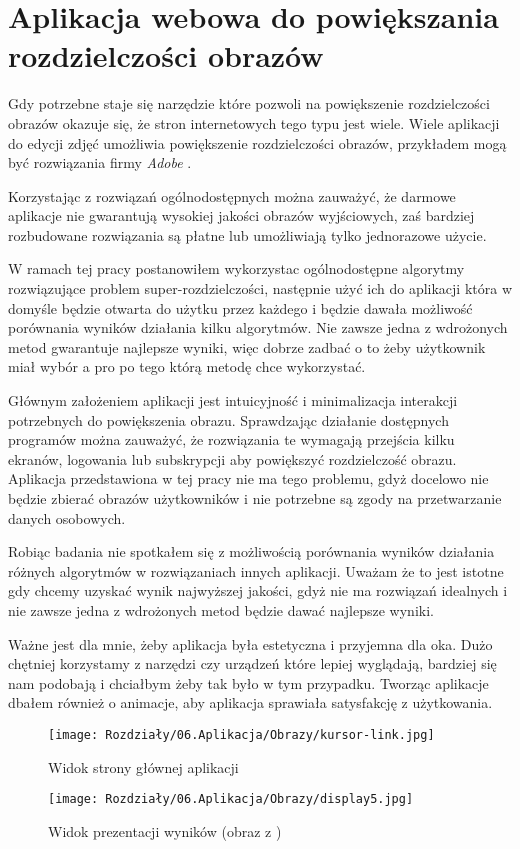 \chapter{Aplikacja webowa do powiększania rozdzielczości obrazów} \label{chap:app}

Gdy potrzebne staje się narzędzie które pozwoli na powiększenie rozdzielczości obrazów okazuje się, że stron internetowych tego typu jest wiele. Wiele aplikacji do edycji zdjęć umożliwia powiększenie rozdzielczości obrazów, przykładem mogą być rozwiązania firmy \textit{Adobe} \cite{adobefonts}.

Korzystając z rozwiązań ogólnodostępnych można zauważyć, że darmowe aplikacje nie gwarantują wysokiej jakości obrazów wyjściowych, zaś bardziej rozbudowane rozwiązania są płatne lub umożliwiają tylko jednorazowe użycie. 

W ramach tej pracy postanowiłem wykorzystac ogólnodostępne algorytmy rozwiązujące problem super-rozdzielczości, następnie użyć ich do aplikacji która w domyśle będzie otwarta do użytku przez każdego i będzie dawała możliwość porównania wyników działania kilku algorytmów. Nie zawsze jedna z wdrożonych metod gwarantuje najlepsze wyniki, więc dobrze zadbać o to żeby użytkownik miał wybór a pro po tego którą metodę chce wykorzystać.

Głównym założeniem aplikacji jest intuicyjność i minimalizacja interakcji potrzebnych do powiększenia obrazu. Sprawdzając działanie dostępnych programów można zauważyć, że rozwiązania te wymagają przejścia kilku ekranów, logowania lub subskrypcji aby powiększyć rozdzielczość obrazu. Aplikacja przedstawiona w tej pracy nie ma tego problemu, gdyż docelowo nie będzie zbierać obrazów użytkowników i nie potrzebne są zgody na przetwarzanie danych osobowych.

Robiąc badania nie spotkałem się z możliwością porównania wyników działania różnych algorytmów w rozwiązaniach innych aplikacji. Uważam że to jest istotne gdy chcemy uzyskać wynik najwyższej jakości, gdyż nie ma rozwiązań idealnych i nie zawsze jedna z wdrożonych metod będzie dawać najlepsze wyniki.

Ważne jest dla mnie, żeby aplikacja była estetyczna i przyjemna dla oka. Dużo chętniej korzystamy z narzędzi czy urządzeń które lepiej wyglądają, bardziej się nam podobają i chciałbym żeby tak było w tym przypadku. Tworząc aplikacje dbałem również o animacje, aby aplikacja sprawiała satysfakcję z użytkowania.

\newpage
\begin{figure}[H]
    \begin{minipage}{\linewidth}
        \centering
        \texttt{[image: Rozdziały/06.Aplikacja/Obrazy/kursor-link.jpg]}  
        \caption{Widok strony głównej aplikacji}
        \label{fig:image80}
        \hspace{2cm}
        \texttt{[image: Rozdziały/06.Aplikacja/Obrazy/display5.jpg]}  
        \caption{Widok prezentacji wyników (obraz z \cite{guo2017deep})}
        \label{fig:image81}
    \end{minipage}
\end{figure}
\newpage

